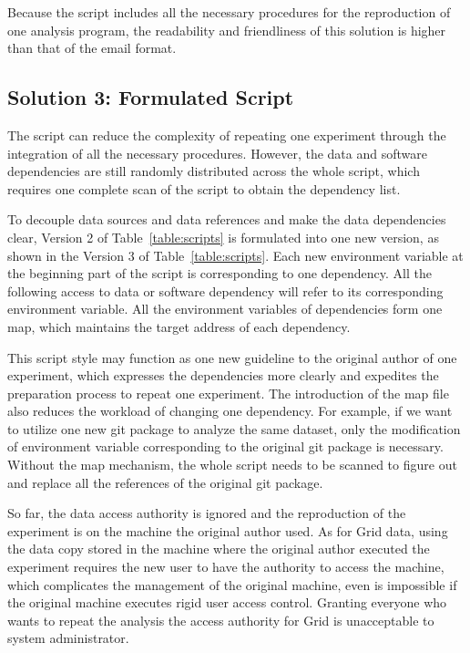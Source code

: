 \documentclass{sig-alternate}
\begin{document}

Because the script includes all the necessary procedures for the reproduction
of one analysis program, the readability and friendliness of this solution is
higher than that of the email format. 


\subsection{Solution 3: Formulated Script}

The script can reduce the complexity of repeating one experiment through the integration of all the necessary procedures. However, the data and software dependencies are still randomly distributed across the whole script, which requires one complete scan of the script to obtain the  dependency list. 

To decouple data sources and data references and make the data dependencies clear, Version 2 of Table~\ref{table:scripts} is formulated into one new version, as shown in
the Version 3 of Table~\ref{table:scripts}. Each new environment variable at the beginning part of
the script is corresponding to one dependency. All the following access to data
or software dependency will refer to its corresponding environment variable.
All the environment variables of dependencies form one map, which maintains the
target address of each dependency.

This script style may function as one new guideline to the original author of
one experiment, which expresses the dependencies more clearly and expedites the
preparation process to repeat one experiment. The introduction of the map file
also reduces the workload of changing one dependency. For example, if we want
to utilize one new git package to analyze the same dataset, only the modification of
environment variable corresponding to the original git package is necessary.
Without the map mechanism, the whole script needs to be scanned to figure out and
replace all the references of the original git package.

So far, the data access authority is ignored and
the reproduction of the experiment is on the machine the original author used. 
As for Grid data, using the data
copy stored in the machine where the original author executed the experiment requires the
new user to have the authority to access the machine, which complicates the
management of the original machine, even is impossible if the original machine
executes rigid user access control. Granting everyone who wants to repeat the
analysis the access authority for Grid is unacceptable to system administrator. 
\end{document}
